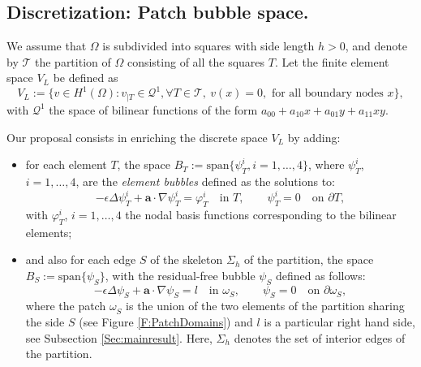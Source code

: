 \documentclass{article}
\newcommand{\Q}{\ensuremath{\mathcal{Q}}\xspace}
\newcommand{\T}{\ensuremath{\mathcal{T}}\xspace}
\newcommand{\aaa}{\ensuremath{\mathbf{a}}\xspace}
\newcommand{\Span}{\text{span}}
\newcommand{\bT}[1][{}]{\ensuremath{\psi_T^{#1}}}
\newcommand{\bS}[1][{}]{\psi_S^{#1}}
\newcommand{\patchS}[1][{}]{\omega_S^{#1}}
\begin{document}
\subsection{Discretization: Patch bubble space.}

We assume that $\Omega$ is subdivided into squares with side length $h>0$, and denote by $\T$ the partition of $\Omega$ consisting of all the squares $T$.
Let the finite element space $V_L$ be defined as
\[
V_L := \{ v \in H^1(\Omega) : v_{|T} \in \Q^1, \forall T\in \T, 
\ v(x) = 0, \text{ for all boundary nodes $x$}  \},
\]
with $\Q^1$ the space of bilinear functions of the form 
$a_{00} + a_{10} x + a_{01} y + a_{11} x y$.

Our proposal consists in enriching the discrete space $V_L$ by adding:
\begin{itemize}
\item for each element $T$, the space $B_T := \Span\{\bT[i], i=1,\dots, 4\}$, where $\bT[i]$, $i=1,\dots,4$, are the \emph{element bubbles} defined as the solutions to:
\[
-\epsilon \Delta \bT[i] + \aaa \cdot \nabla \bT[i] 
= \varphi_T^i 
\quad\text{in $T$}, 
\qquad 
\bT[i] = 0 
\quad\text{on $\partial T$},
\] 
with $\varphi_T^i$, $i=1,\dots, 4$ the nodal basis functions corresponding to the bilinear elements;
\item and also for each edge $S$ of the skeleton $\Sigma_h$ of the partition, the space $B_S := \Span\{\bS\}$, with the residual-free bubble $\bS$ defined as follows:
\[
-\epsilon \Delta \bS + \aaa \cdot \nabla \bS = l 
\quad\text{in $\patchS$}, 
\qquad 
\bS = 0 \quad\text{on $\partial\patchS$},
\]
where the patch $\patchS$ is the union of the two elements of the partition sharing the side $S$ (see Figure \ref{F:PatchDomains})
and $l$ is a particular right hand side, see Subsection \ref{Sec:mainresult}. Here, $\Sigma_h$ denotes the set of interior edges of the partition. 
\end{itemize}
\end{document}
